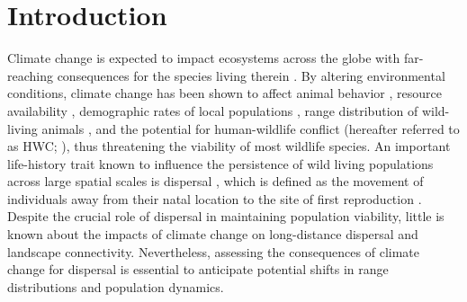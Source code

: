 \documentclass[abstract=on,10pt,a4paper,bibliography=totocnumbered]{article}
\begin{document}
\newpage


\newpage
{}

\linenumbers

\section{Introduction}

Climate change is expected to impact ecosystems across the globe with
far-reaching consequences for the species living therein \citep{Paniw.2019,
Radchuk.2019, IPCC.2022, Ozgul.2023}. By altering environmental conditions,
climate change has been shown to affect animal behavior \citep{Fuller.2016},
resource availability \citep{Durant.2007}, demographic rates of local
populations \citep{Paniw.2021}, range distribution of wild-living animals
\citep{Thomas.2004, Thuiller.2006}, and the potential for human-wildlife
conflict (hereafter referred to as HWC; \citealp{Abrahms.2023}), thus
threatening the viability of most wildlife species. An important life-history
trait known to influence the persistence of wild living populations across large
spatial scales is dispersal \citep{Hanski.1999, Bowler.2005, Kokko.2006}, which
is defined as the movement of individuals away from their natal location to the
site of first reproduction \citep{Clobert.2012}. Despite the crucial role of
dispersal in maintaining population viability, little is known about the impacts
of climate change on long-distance dispersal and landscape connectivity.
Nevertheless, assessing the consequences of climate change for dispersal is
essential to anticipate potential shifts in range distributions and population
dynamics.
\end{document}
